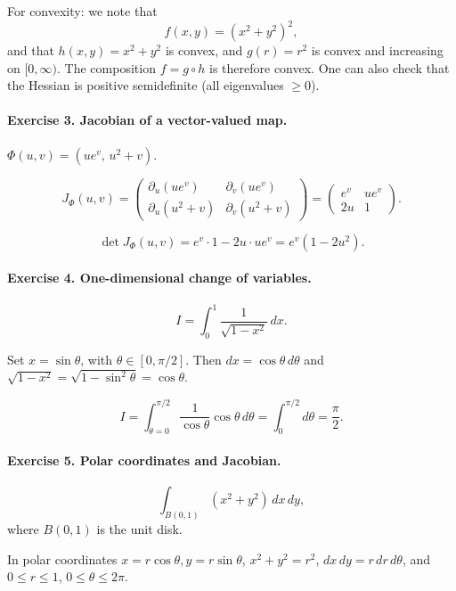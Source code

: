 \documentclass[11pt]{article}
\begin{document}
For convexity: we note that
\[
f(x,y)=(x^2+y^2)^2,
\]
and that \(h(x,y)=x^2+y^2\) is convex, and \(g(r)=r^2\) is convex and increasing on \([0,\infty)\).  
The composition \(f=g\circ h\) is therefore convex.  
One can also check that the Hessian is positive semidefinite (all eigenvalues \(\ge 0\)).

\bigskip

\paragraph{Exercise 3. Jacobian of a vector-valued map.}

\(\Phi(u,v)=(u e^{v},\,u^2+v).\)

\[
J_\Phi(u,v)=
\begin{pmatrix}
\partial_u(ue^v) & \partial_v(ue^v)\\[4pt]
\partial_u(u^2+v) & \partial_v(u^2+v)
\end{pmatrix}
=
\begin{pmatrix}
e^v & u e^v\\[4pt]
2u & 1
\end{pmatrix}.
\]

\[
\det J_\Phi(u,v)= e^v\cdot 1 - 2u\cdot u e^v = e^v(1-2u^2).
\]

\bigskip

\paragraph{Exercise 4. One-dimensional change of variables.}

\[
I=\int_0^1 \frac{1}{\sqrt{1-x^2}}\,dx.
\]

Set \(x=\sin\theta\), with \(\theta\in[0,\pi/2]\).  
Then \(dx=\cos\theta\,d\theta\) and \(\sqrt{1-x^2}=\sqrt{1-\sin^2\theta}=\cos\theta\).

\[
I=\int_{\theta=0}^{\pi/2} \frac{1}{\cos\theta}\cos\theta\,d\theta
=\int_0^{\pi/2} d\theta
=\frac{\pi}{2}.
\]

\bigskip


\paragraph{Exercise 5. Polar coordinates and Jacobian.}

\[
\int_{B(0,1)} (x^2+y^2)\,dx\,dy,
\]
where \(B(0,1)\) is the unit disk.

In polar coordinates \(x=r\cos\theta,y=r\sin\theta\), \(x^2+y^2=r^2\), \(dx\,dy=r\,dr\,d\theta\), and \(0\le r\le 1\), \(0\le\theta\le2\pi\).
\end{document}
